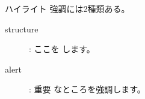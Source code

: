 \documentclass[dvipdfmx, 12pt]{beamer}  %
\begin{document}
\begin{frame}{ハイライト}
  強調には2種類ある。

  \begin{description}
    \item[structure]: ここを  します。
    \item[alert]: \alert{重要} なところを強調します。
  \end{description}
\end{frame}

\end{document}
